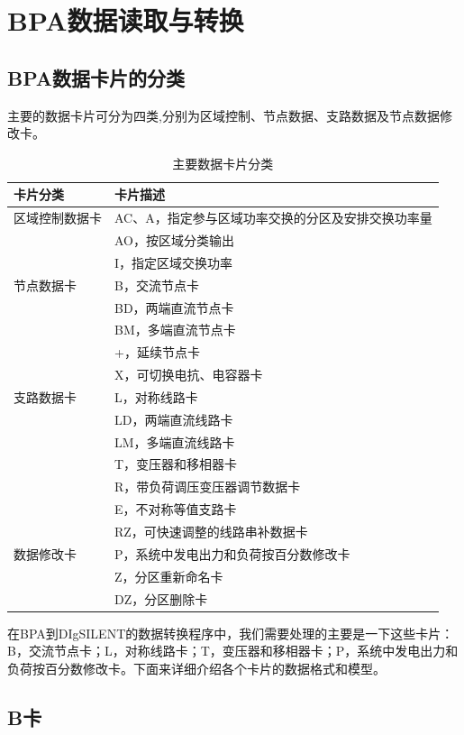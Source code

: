 \chapter{BPA数据读取与转换}

\section{BPA数据卡片的分类}

主要的数据卡片可分为四类,分别为区域控制、节点数据、支路数据及节点数据修改卡。

\begin{table}[h]
\centering
\begin{tabular}{ll}
\toprule
卡片分类 & 卡片描述\\
\midrule
 区域控制数据卡 & AC、A，指定参与区域功率交换的分区及安排交换功率量 \\ 
 & AO，按区域分类输出 \\ 
 & I，指定区域交换功率 \\ 
 \midrule
 节点数据卡 & B，交流节点卡\\
 & BD，两端直流节点卡\\
 & BM，多端直流节点卡\\
 & +，延续节点卡\\
 & X，可切换电抗、电容器卡\\
 \midrule
 支路数据卡 & L，对称线路卡\\
 & LD，两端直流线路卡\\
 & LM，多端直流线路卡\\
 & T，变压器和移相器卡\\
 & R，带负荷调压变压器调节数据卡\\
 & E，不对称等值支路卡\\
 & RZ，可快速调整的线路串补数据卡\\
 \midrule
 数据修改卡 & P，系统中发电出力和负荷按百分数修改卡\\
 & Z，分区重新命名卡\\
 & DZ，分区删除卡\\
\bottomrule
\end{tabular}
\caption{主要数据卡片分类}
\end{table}

在BPA到DIgSILENT的数据转换程序中，我们需要处理的主要是一下这些卡片：B，交流节点卡；L，对称线路卡；T，变压器和移相器卡；P，系统中发电出力和负荷按百分数修改卡。下面来详细介绍各个卡片的数据格式和模型。

\section{B卡}

